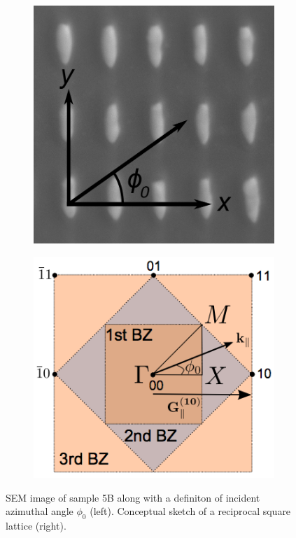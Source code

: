 \begin{figure}
    \begin{subfigure}{0.49\textwidth}
        \flushright
        \includegraphics[width=0.5\linewidth]{figures/Ch3/s5b/S5B_schematic.png}
    \end{subfigure}
    \begin{subfigure}{0.49\textwidth}
        \flushleft
        \includegraphics[width=0.6\linewidth]{figures/Ch2/ReciprocalLattice.png}
    \end{subfigure}
    \caption{SEM image of sample 5B along with a definiton of incident azimuthal angle $\phi_0$ (left). Conceptual sketch of a reciprocal square lattice (right).}
    \label{fig:s5b_sem_reciprocallattice}
\end{figure}

